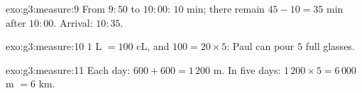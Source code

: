 \begin{solution}{exo:g3:measure:9}
From $9{:}50$ to $10{:}00$: $10$ min; there remain
$45 - 10 = 35$ min after $10{:}00$. Arrival: $10{:}35$.
\end{solution}

\begin{solution}{exo:g3:measure:10}
$1$ L $= 100$ cL, and $100 = 20 \times 5$: Paul can pour $5$ full
glasses.
\end{solution}

\begin{solution}{exo:g3:measure:11}
Each day: $600 + 600 = 1\,200$ m. In five days:
$1\,200 \times 5 = 6\,000$ m $= 6$ km.
\end{solution}

